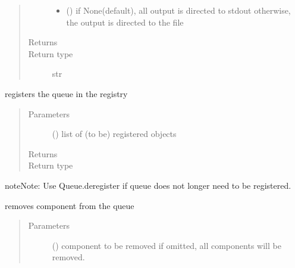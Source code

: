 \documentclass[letterpaper,10pt,english]{sphinxmanual}
\begin{document}
\begin{fulllineitems}
\begin{fulllineitems}
\begin{quote}
\begin{description}
\begin{itemize}
\item {} 
 () \textendash{} if None(default), all output is directed to stdout 
otherwise, the output is directed to the file

\end{itemize}

\item[{Returns}] \leavevmode
{}

\item[{Return type}] \leavevmode
str

\end{description}\end{quote}

\end{fulllineitems}


\begin{fulllineitems}
\label{\detokenize{Reference:salabim.Queue.register}}
registers the queue in the registry
\begin{quote}\begin{description}
\item[{Parameters}] \leavevmode
{} () \textendash{} list of (to be) registered objects

\item[{Returns}] \leavevmode
{}

\item[{Return type}] \leavevmode
{\hyperref[\detokenize{Reference:salabim.Queue}]{}}

\end{description}\end{quote}

\begin{sphinxadmonition}{note}{Note:}
Use Queue.deregister if queue does not longer need to be registered.
\end{sphinxadmonition}

\end{fulllineitems}


\begin{fulllineitems}
\label{\detokenize{Reference:salabim.Queue.remove}}
removes component from the queue
\begin{quote}\begin{description}
\item[{Parameters}] \leavevmode
{} ({\hyperref[\detokenize{Reference:salabim.Component}]{}}) \textendash{} component to be removed 
if omitted, all components will be removed.


\end{description}
\end{quote}
\end{fulllineitems}
\end{fulllineitems}
\end{document}
